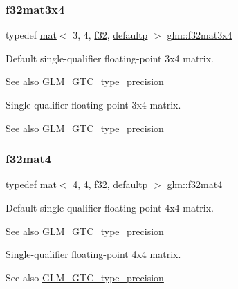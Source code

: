 \subsubsection{\texorpdfstring{f32mat3x4}{f32mat3x4}}
{\footnotesize\ttfamily typedef \hyperlink{structglm_1_1mat}{mat}$<$ 3, 4, \hyperlink{group__gtc__type__precision_ga0ec999b57f5330d9021256e96038df04}{f32}, \hyperlink{namespaceglm_a36ed105b07c7746804d7fdc7cc90ff25a9d21ccd8b5a009ec7eb7677befc3bf51}{defaultp} $>$ \hyperlink{group__gtc__type__precision_ga8459d79e94eb107e31f0ee600e9bae3f}{glm\+::f32mat3x4}}

Default single-\/qualifier floating-\/point 3x4 matrix. \begin{DoxySeeAlso}{See also}
\hyperlink{group__gtc__type__precision}{G\+L\+M\+\_\+\+G\+T\+C\+\_\+type\+\_\+precision}
\end{DoxySeeAlso}
Single-\/qualifier floating-\/point 3x4 matrix. \begin{DoxySeeAlso}{See also}
\hyperlink{group__gtc__type__precision}{G\+L\+M\+\_\+\+G\+T\+C\+\_\+type\+\_\+precision} 
\end{DoxySeeAlso}
\mbox{\label{group__gtc__type__precision_ga4f0717d91e376ba76e675324dbe21576}} 
\subsubsection{\texorpdfstring{f32mat4}{f32mat4}}
{\footnotesize\ttfamily typedef \hyperlink{structglm_1_1mat}{mat}$<$ 4, 4, \hyperlink{group__gtc__type__precision_ga0ec999b57f5330d9021256e96038df04}{f32}, \hyperlink{namespaceglm_a36ed105b07c7746804d7fdc7cc90ff25a9d21ccd8b5a009ec7eb7677befc3bf51}{defaultp} $>$ \hyperlink{group__gtc__type__precision_ga4f0717d91e376ba76e675324dbe21576}{glm\+::f32mat4}}

Default single-\/qualifier floating-\/point 4x4 matrix. \begin{DoxySeeAlso}{See also}
\hyperlink{group__gtc__type__precision}{G\+L\+M\+\_\+\+G\+T\+C\+\_\+type\+\_\+precision}
\end{DoxySeeAlso}
Single-\/qualifier floating-\/point 4x4 matrix. \begin{DoxySeeAlso}{See also}
\hyperlink{group__gtc__type__precision}{G\+L\+M\+\_\+\+G\+T\+C\+\_\+type\+\_\+precision} 
\end{DoxySeeAlso}
\mbox{\label{group__gtc__type__precision_gab0498cc84bb77002f41630e3cd0be87b}} 
